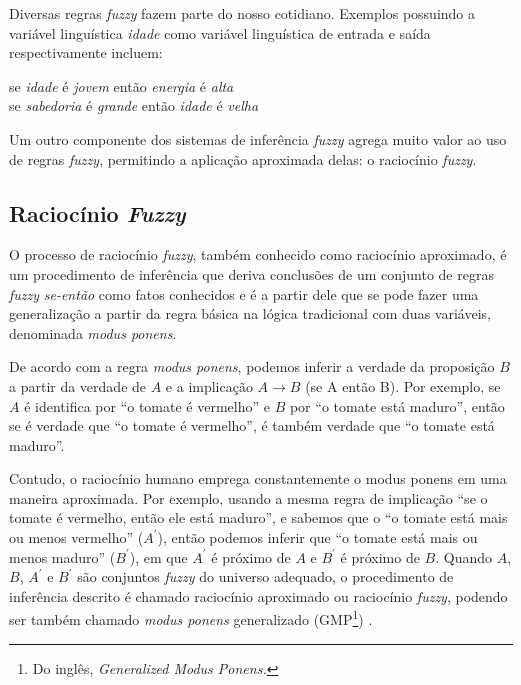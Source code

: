Diversas regras \textit{fuzzy} fazem parte do nosso cotidiano. Exemplos possuindo a variável linguística \textit{idade} como variável linguística de entrada e saída respectivamente incluem:
\begin{center}
se \textit{idade} é \textit{jovem} então \textit{energia} é \textit{alta} \\
se \textit{sabedoria} é \textit{grande} então \textit{idade} é \textit{velha}
\end{center}

Um outro componente dos sistemas de inferência \textit{fuzzy} agrega muito valor ao uso de regras \textit{fuzzy}, permitindo a aplicação aproximada delas: o raciocínio \textit{fuzzy}.

\subsection{Raciocínio \textit{Fuzzy}}
\label{sec:raciocinio_fuzzy}

O processo de raciocínio \textit{fuzzy}, também conhecido como raciocínio aproximado, é um procedimento de inferência que deriva conclusões de um conjunto de regras \textit{fuzzy} \textit{se-então} como fatos conhecidos \cite[p.~62]{Jang1997} e é a partir dele que se pode fazer uma generalização a partir da regra básica na lógica tradicional com duas variáveis, denominada \textit{modus ponens}.

De acordo com a regra \textit{modus ponens}, podemos inferir a verdade da proposição $B$ a partir da verdade de $A$ e a implicação $A \rightarrow B$ (se A então B). Por exemplo, se $A$ é identifica por ``o tomate é vermelho'' e $B$ por ``o tomate está maduro'', então se é verdade que ``o tomate é vermelho'', é também verdade que ``o tomate está maduro''.

Contudo, o raciocínio humano emprega constantemente o modus ponens em uma maneira aproximada. Por exemplo, usando a mesma regra de implicação ``se o tomate é vermelho, então ele está maduro'', e sabemos que o ``o tomate está mais ou menos vermelho'' ($A^\prime$), então podemos inferir que ``o tomate está mais ou menos maduro'' ($B^\prime$), em que $A^\prime$ é próximo de $A$ e $B^\prime$ é próximo de $B$. Quando $A$, $B$, $A^\prime$ e $B^\prime$ são conjuntos \textit{fuzzy} do universo adequado, o procedimento de inferência descrito é chamado raciocínio aproximado ou raciocínio \textit{fuzzy}, podendo ser também chamado \textit{modus ponens} generalizado (GMP\footnote{Do inglês, \textit{Generalized Modus Ponens.}}) \cite[p.~65]{Jang1997}.

